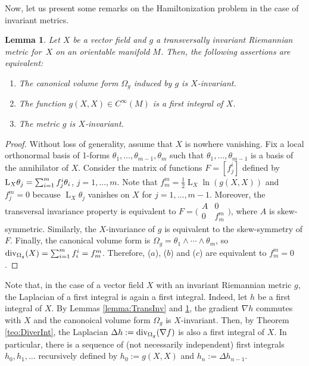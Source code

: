 \documentclass[pdftex]{sigma}%
\numberwithin{equation}{section}
\newtheorem{Lemma}[Theorem]{Lemma}
\begin{document}
Now, let us present some remarks on the Hamiltonization problem in the case of invariant metrics.

\begin{Lemma}\label{lemma:MetricXinv}
Let $X$ be a vector field and $g$ a transversally invariant Riemannian metric for~$X$ on an orientable manifold $M$. Then, the following assertions are equivalent:
 \begin{enumerate}\itemsep=0pt
 \item[$(a)$] The canonical volume form $\Omega_{g}$ induced by $g$ is $X$-invariant.
 \item[$(b)$] The function $g(X,X)\in C^{\infty}(M)$ is a first integral of $X$.
 \item[$(c)$] The metric $g$ is $X$-invariant.
 \end{enumerate}
\end{Lemma}
\begin{proof}
Without loss of generality, assume that $X$ is nowhere vanishing. Fix a local orthonormal basis of 1-forms $\theta_1,\dots,\theta_{m-1},\theta_{m}$ such that $\theta_1,\dots,\theta_{m-1}$ is a basis of the annihilator of $X$. Consider the matrix of functions $F=[f^{i}_{j}]$ defined by ${\rm L}_{X}\theta_{j}=\sum_{i=1}^{m}f^{i}_{j}\theta_{i}$, $j=1,\dots,m$. Note that $f^{m}_{m}=\tfrac{1}{2}\operatorname{L}_{X}\ln(g(X,X))$ and $f^{m}_{j}=0$ because $\operatorname{L}_{X}\theta_{j}$ vanishes on $X$ for $j=1,\dots,m-1$. Moreover, the transversal invariance property is equivalent to
$F = \big(\begin{smallmatrix}
 A & 0 \\
 0 & f^{m}_{m}
 \end{smallmatrix}\big)$,
where $A$ is skew-symmetric. Similarly, the $X$-invariance of $g$ is equivalent to the skew-symmetry of $F$. Finally, the canonical volume form is $\Omega_{g}=\theta_1\wedge\cdots\wedge\theta_{m}$, so ${\rm div}_{\Omega_{g}}(X)=\sum_{i=1}^{m}f^{i}_{i} = f^{m}_{m}$. Therefore, ($a$), ($b$) and ($c$) are equivalent to $f^{m}_{m}=0$.
\end{proof}

Note that, in the case of a vector field $X$ with an invariant Riemannian metric $g$, the Laplacian of a first integral is again a first integral. Indeed, let $h$ be a first integral of $X$. By Lemmas \ref{lemma:TransInv} and \ref{lemma:MetricXinv}, the gradient $\nabla h$ commutes with $X$ and the canonoical volume form $\Omega_{g}$ is $X$-invariant. Then, by Theorem \ref{teo:DiverInt}, the Laplacian $\Delta h := {\rm div}_{\Omega_{g}}(\nabla f)$ is also a first integral of $X$. In particular, there is a sequence of (not necessarily independent) first integrals $h_0,h_1,\dots$ recursively defined by $h_0:=g(X,X)$ and $h_n:=\Delta h_{n-1}$.
\end{document}

